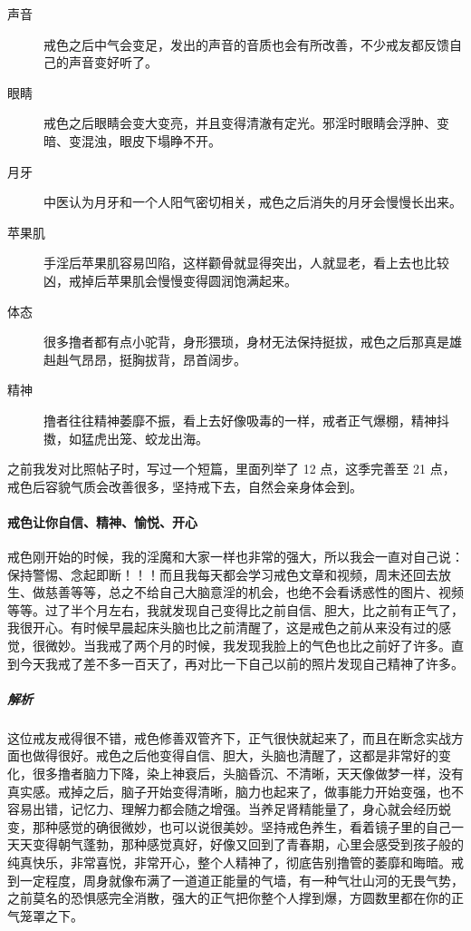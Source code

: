 \begin{multicols}{2}
\begin{description}
        \item[声音] 戒色之后中气会变足，发出的声音的音质也会有所改善，不少戒友都反馈自己的声音变好听了。
        \item[眼睛] 戒色之后眼睛会变大变亮，并且变得清澈有定光。邪淫时眼睛会浮肿、变暗、变混浊，眼皮下塌睁不开。
        \item[月牙] 中医认为月牙和一个人阳气密切相关，戒色之后消失的月牙会慢慢长出来。
        \item[苹果肌] 手淫后苹果肌容易凹陷，这样颧骨就显得突出，人就显老，看上去也比较凶，戒掉后苹果肌会慢慢变得圆润饱满起来。
        \item[体态] 很多撸者都有点小驼背，身形猥琐，身材无法保持挺拔，戒色之后那真是雄赳赳气昂昂，挺胸拔背，昂首阔步。
        \item[精神] 撸者往往精神萎靡不振，看上去好像吸毒的一样，戒者正气爆棚，精神抖擞，如猛虎出笼、蛟龙出海。
    \end{description}
\end{multicols}

之前我发对比照帖子时，写过一个短篇，里面列举了 12 点，这季完善至 21 点，戒色后容貌气质会改善很多，坚持戒下去，自然会亲身体会到。

\paragraph{戒色让你自信、精神、愉悦、开心}

\begin{case}
    戒色刚开始的时候，我的淫魔和大家一样也非常的强大，所以我会一直对自己说：保持警惕、念起即断！！！而且我每天都会学习戒色文章和视频，周末还回去放生、做慈善等等，总之不给自己大脑意淫的机会，也绝不会看诱惑性的图片、视频等等。过了半个月左右，我就发现自己变得比之前自信、胆大，比之前有正气了，我很开心。有时候早晨起床头脑也比之前清醒了，这是戒色之前从来没有过的感觉，很微妙。当我戒了两个月的时候，我发现我脸上的气色也比之前好了许多。直到今天我戒了差不多一百天了，再对比一下自己以前的照片发现自己精神了许多。
    \subparagraph{解析} 这位戒友戒得很不错，戒色修善双管齐下，正气很快就起来了，而且在断念实战方面也做得很好。戒色之后他变得自信、胆大，头脑也清醒了，这都是非常好的变化，很多撸者脑力下降，染上神衰后，头脑昏沉、不清晰，天天像做梦一样，没有真实感。戒掉之后，脑子开始变得清晰，脑力也起来了，做事能力开始变强，也不容易出错，记忆力、理解力都会随之增强。当养足肾精能量了，身心就会经历蜕变，那种感觉的确很微妙，也可以说很美妙。坚持戒色养生，看着镜子里的自己一天天变得朝气蓬勃，那种感觉真好，好像又回到了青春期，心里会感受到孩子般的纯真快乐，非常喜悦，非常开心，整个人精神了，彻底告别撸管的萎靡和晦暗。戒到一定程度，周身就像布满了一道道正能量的气墙，有一种气壮山河的无畏气势，之前莫名的恐惧感完全消散，强大的正气把你整个人撑到爆，方圆数里都在你的正气笼罩之下。
\end{case}

